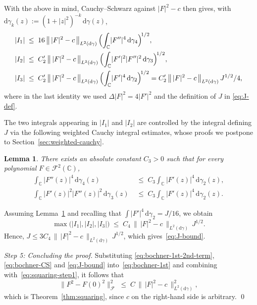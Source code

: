 \documentclass[a4paper,11pt,reqno]{amsart}
\numberwithin{equation}{section}
\theoremstyle{plain} %
\newtheorem{lemma}{Lemma}[section]
\theoremstyle{definition} %
\theoremstyle{remark}
\newcommand{\C}{\mathbb{C}}
\newcommand{\abs}[1]{\lvert #1 \rvert}
\newcommand{\norm}[1]{\lVert #1 \rVert}
\newcommand{\dd}{\mathrm{d}}
\begin{document}
With the above in mind, Cauchy--Schwarz against $\abs{F}^2 - c$ then gives, with $\dd\gamma_k(z)
:= (1+\abs{z}^2)^{-k}\,\dd\gamma(z)$,
\begin{align*}
\abs{I_1}
&\;\le\; 16\,\bigl\|\,\abs{F}^2-c\,\bigr\|_{L^2(\dd\gamma)}\,
\Bigl(\int_{\C}\abs{F''}^4\,\dd\gamma_4\Bigr)^{\!1/2}, \\
\abs{I_2}
&\;\le\; C_2'\,\bigl\|\,\abs{F}^2-c\,\bigr\|_{L^2(\dd\gamma)}\,
\Bigl(\int_{\C}\abs{F'}^2\abs{F''}^2\,\dd\gamma_3\Bigr)^{\!1/2}, \\
\abs{I_3}
&\;\le\; C_2'\,\bigl\|\,\abs{F}^2-c\,\bigr\|_{L^2(\dd\gamma)}\,
\Bigl(\int_{\C}\abs{F'}^4\,\dd\gamma_2\Bigr)^{\!1/2}
= C_2'\,\bigl\|\,\abs{F}^2-c\,\bigr\|_{L^2(\dd\gamma)}\, J^{1/2}/4,
\end{align*}
where in the last identity we used $\Delta\abs{F}^2 = 4\abs{F'}^2$ and the definition
 of $J$ in \eqref{eq:J-def}.

\medskip

The two integrals appearing in $\abs{I_1}$ and $\abs{I_2}$ are controlled
by the integral defining $J$ via the following weighted Cauchy integral
estimates, whose proofs we postpone to Section~\ref{sec:weighted-cauchy}.

\begin{lemma}\label{lem:weighted-cauchy}
There exists an absolute constant $C_3 > 0$ such that for every polynomial
$F \in \mathcal{F}^2(\C)$,
\begin{align*}
\int_{\C} \abs{F''(z)}^4\, \dd\gamma_4(z)
&\;\le\; C_3 \int_{\C} \abs{F'(z)}^4\, \dd\gamma_2(z),
\\
\int_{\C} \abs{F'(z)}^2\abs{F''(z)}^2\, \dd\gamma_3(z)
&\;\le\; C_3 \int_{\C} \abs{F'(z)}^4\, \dd\gamma_2(z).
\label{eq:cauchy-mixed}
\end{align*}
\end{lemma}

Assuming Lemma~\ref{lem:weighted-cauchy} and recalling that $\int\abs{F'}^4
\,\dd\gamma_2 = J/16$, we obtain
\[
\max\bigl(\abs{I_1},\abs{I_2},\abs{I_3}\bigr)
\;\le\;
C_4\,\bigl\|\,\abs{F}^2 - c\,\bigr\|_{L^2(\dd\gamma)}\, J^{1/2}.
\]
Hence, $J \le 3 C_4\,\bigl\|\,\abs{F}^2-c\,\bigr\|_{L^2(\dd\gamma)}\,
J^{1/2}$, which gives~\eqref{eq:J-bound}. 

\medskip
\noindent\emph{Step 5: Concluding the proof.}\;
Substituting \eqref{eq:bochner-1st-2nd-term},
\eqref{eq:bochner-CS} and \eqref{eq:J-bound}
into~\eqref{eq:bochner-1st} and combining with~\eqref{eq:squaring-step1}, it follows that
\[
\norm{F^2 - F(0)^2}_{\mathcal{F}}^2
\;\le\;
C\,\bigl\|\,\abs{F}^2 - c\,\bigr\|_{L^2(\dd\gamma)}^2,
\]
which is Theorem~\ref{thm:squaring}, since $c$ on the right-hand side is arbitrary. 
\qed
\end{document}
